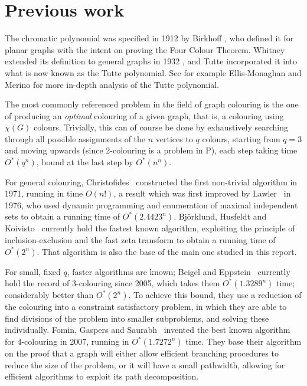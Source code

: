 \documentclass{cslthse-msc}
\begin{document}
\section{Previous work}
The chromatic polynomial was specified in 1912 by Birkhoff \cite{birkhoff}, who defined it for planar graphs with the intent on proving the Four Colour Theorem. Whitney extended its definition to general graphs in 1932 \cite{whitney}, and Tutte incorporated it into what is now known as the Tutte polynomial. See for example Ellis-Monaghan and Merino \cite{tuttebook} for more in-depth analysis of the Tutte polynomial.

The most commonly referenced problem in the field of graph colouring is the one of producing an \emph{optimal} colouring of a given graph, that is, a colouring using $\chi(G)$ colours. Trivially, this can of course be done by exhaustively searching through all possible assignments of the $n$ vertices to $q$ colours, starting from $q = 3$ and moving upwards (since 2-colouring is a problem in P), each step taking time $O^*(q^n)$, bound at the last step by $O^*(n^n)$. 

For general colouring, Christofides~\cite{christo} constructed the first non-trivial algorithm in 1971, running in time $O(n!)$, a result which was first improved by Lawler~\cite{lawler} in 1976, who used dynamic programming and enumeration of maximal independent sets to obtain a running time of $O^*(2.4423^n)$. Björklund, Husfeldt and Koivisto~\cite{bhk1} currently hold the fastest known algorithm, exploiting the principle of inclusion-exclusion and the fast zeta transform to obtain a running time of $O^*(2^n)$. That algorithm is also the base of the main one studied in this report.

For small, fixed $q$, faster algorithms are known; Beigel and Eppstein~\cite{3coloring} currently hold the record of 3-colouring since 2005, which takes them $O^*(1.3289^n)$ time; considerably better than $O^*(2^n)$. To achieve this bound, they use a reduction of the colouring into a constraint satisfactory problem, in which they are able to find divisions of the problem into smaller subproblems, and solving these individually.
Fomin, Gaspers and Saurabh~\cite{4coloring} invented the best known algorithm for 4-colouring in 2007, running in $O^*(1.7272^n)$ time. They base their algorithm on the proof that a graph will either allow efficient branching procedures to reduce the size of the problem, or it will have a small pathwidth, allowing for efficient algorithms to exploit its path decomposition.
\end{document}
